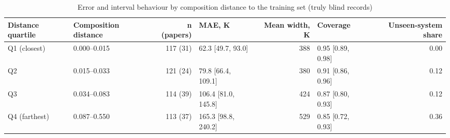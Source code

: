 \begin{table}
\caption{Error and interval behaviour by composition distance to the training set (truly blind records)}
\label{tab:tableS3_error_vs_distance}
\tablefont
\begin{tabularx}{\textwidth}{@{}>{\raggedright\arraybackslash}Xlrlrlr@{}}
\toprule
\textbf{Distance quartile} & \textbf{Composition distance} & \textbf{n (papers)} & \textbf{MAE, K} & \textbf{Mean width, K} & \textbf{Coverage} & \textbf{Unseen-system share} \\
\midrule
Q1 (closest) & 0.000--0.015 & 117 (31) & 62.3 [49.7, 93.0] & 388 & 0.95 [0.89, 0.98] & 0.00 \\
Q2 & 0.015--0.033 & 121 (24) & 79.8 [66.4, 109.1] & 380 & 0.91 [0.86, 0.96] & 0.12 \\
Q3 & 0.034--0.083 & 114 (39) & 106.4 [81.0, 145.8] & 424 & 0.87 [0.80, 0.93] & 0.12 \\
Q4 (farthest) & 0.087--0.550 & 113 (37) & 165.3 [98.8, 240.2] & 529 & 0.85 [0.72, 0.93] & 0.36 \\
\bottomrule
\end{tabularx}
\end{table}
